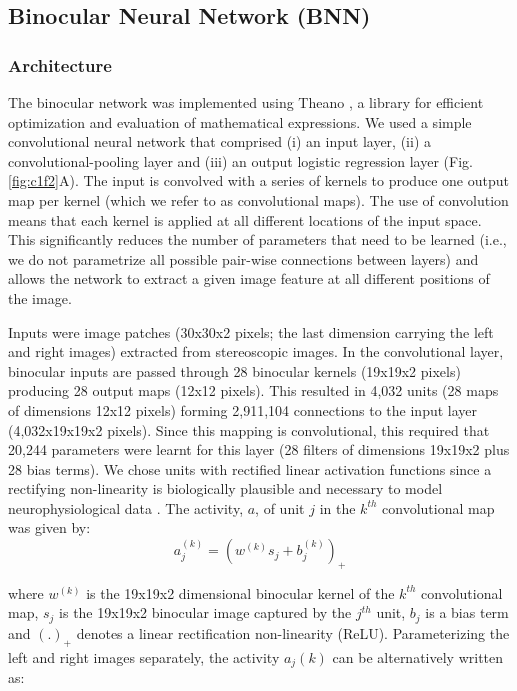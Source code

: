 \subsection*{Binocular Neural Network (BNN)}

\subsubsection*{Architecture}

The binocular network was implemented using Theano \cite{2016arXiv160502688T}, a library for efficient optimization and evaluation of mathematical expressions. We used a simple convolutional neural network that comprised (i) an input layer, (ii) a convolutional-pooling layer and (iii) an output logistic regression layer (Fig. \ref{fig:c1f2}A). The input is convolved with a series of kernels to produce one output map per kernel (which we refer to as convolutional maps). The use of convolution means that each kernel is applied at all different locations of the input space. This significantly reduces the number of parameters that need to be learned (i.e., we do not parametrize all possible pair-wise connections between layers) and allows the network to extract a given image feature at all different positions of the image. 

Inputs were image patches (30x30x2 pixels; the last dimension carrying the left and right images) extracted from stereoscopic images. In the convolutional layer, binocular inputs are passed through 28 binocular kernels (19x19x2 pixels) producing 28 output maps (12x12 pixels). This resulted in 4,032 units (28 maps of dimensions 12x12 pixels) forming 2,911,104 connections to the input layer (4,032x19x19x2 pixels). Since this mapping is convolutional, this required that 20,244 parameters were learnt for this layer (28 filters of dimensions 19x19x2 plus 28 bias terms). We chose units with rectified linear activation functions since a rectifying non-linearity is biologically plausible and necessary to model neurophysiological data \cite{Movshon:1978dq}. The activity, $a$, of unit $j$ in the $k^{th}$ convolutional map was given by:
\begin{equation}
  a_j^{(k)}=(w^{(k)}s_j + b_j^{(k)} )_+
\end{equation}

where $w^{(k)}$ is the 19x19x2 dimensional binocular kernel of the $k^{th}$ convolutional map, $s_j$ is the 19x19x2 binocular image captured by the $j^{th}$ unit, $b_j$ is a bias term and $(.)_+$ denotes a linear rectification non-linearity (ReLU). Parameterizing the left and right images separately, the activity $a_j{(k)}$ can be alternatively written as:

